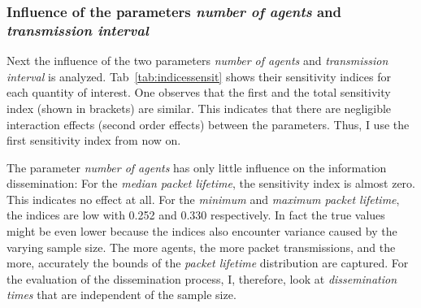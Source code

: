 \subsubsection{Influence of the parameters \textit{number of agents} and \textit{transmission interval}}
Next the influence of the two parameters \textit{number of agents} and \textit{transmission interval} is analyzed. Tab~\ref{tab:indicessensit} shows their sensitivity indices for each quantity of interest. One observes that the first and the total sensitivity index (shown in brackets) are similar. This indicates that there are negligible interaction effects (second order effects) between the parameters. Thus, I use the first sensitivity index from now on.


The parameter \textit{number of agents} has only little influence on the information dissemination: For the \textit{median packet lifetime}, the sensitivity index is almost zero. This indicates no effect at all. For the \textit{minimum} and \textit{maximum packet lifetime}, the indices are low with 0.252 and 0.330 respectively. In fact the true values might be even lower because the indices also encounter variance caused by the varying sample size. The more agents, the more packet transmissions, and the more, accurately the bounds of the \textit{packet lifetime} distribution are captured. For the evaluation of the dissemination process, I, therefore, look at \textit{dissemination times} that are independent of the sample size.

